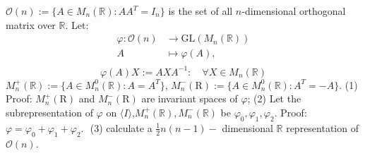 \documentclass{ctexart}
\begin{document}
\setcounter{problem}{2}
\begin{problem}
    $\mathcal{O}(n):=\{A\in M_n(\mathbb{R}):AA^T=I_n\}$ is the set of all $n$-dimensional orthogonal matrix over $\mathbb{R}$. Let: 
    \begin{equation}
     \begin{aligned}
         \varphi: \mathcal{O}(n) &\rightarrow \mathrm{GL}\left(M_n(\mathbb{R})\right) \\
         A &\mapsto \varphi(A), \\
     \end{aligned}
    \end{equation}
     \begin{equation}
  \varphi(A) X:=A X A^{-1}: \quad \forall X \in M_n(\mathbb{R}) 
     \end{equation}
  $M_n^{+}(\mathbb{R}):=\{A\in M_n^0(\mathbb{R}): A=A^T\}$, $M_n^{-}(\mathrm{R}):=\{A\in M_n^0(\mathbb{R}): A^T=-A\}$.
     (1) Proof: $M_n^{+}(\mathrm{R})$ and $M_n^{-}(\mathrm{R})$ are invariant spaces of $\varphi$;
     (2) Let the subrepresentation of $\varphi$ on $\langle I \rangle$,$ M_n^{+}(\mathbb{R}), M_n^{-}(\mathbb{R})$ be  $\varphi_0, \varphi_1, \varphi_2$. Proof:
     $
     \varphi=\varphi_0+\varphi_1+\varphi_2 \text {. }
     $
     (3) calculate a $\frac{1}{2} n(n-1)-$ dimensional $ \mathbb{R}$ representation of $\mathcal{O}(n)$.
 \end{problem}
\end{document}
